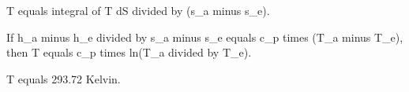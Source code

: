 T equals integral of T dS divided by (s_a minus s_e).  

If h_a minus h_e divided by s_a minus s_e equals c_p times (T_a minus T_e),  
then T equals c_p times ln(T_a divided by T_e).  

T equals 293.72 Kelvin.